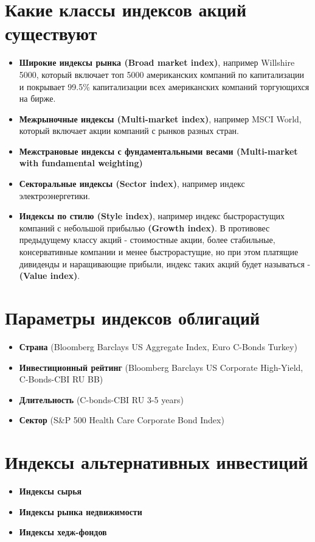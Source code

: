 \documentclass{article}
\begin{document}
\section{Какие классы индексов акций существуют}

\begin{itemize}
  \item \textbf{Широкие индексы рынка (Broad market index)}, например Willshire 5000, который включает топ 5000 американских компаний по капитализации и покрывает 99.5\% капитализации всех американских компаний торгующихся на бирже.
  \item \textbf{Межрыночные индексы (Multi-market index)}, например MSCI World, который включает акции компаний с рынков разных стран.
  \item \textbf{Межстрановые индексы с фундаментальными весами (Multi-market with fundamental weighting)}
  \item \textbf{Секторальные индексы (Sector index)}, например индекс электроэнергетики.
  \item  \textbf{Индексы по стилю (Style index)}, например индекс быстрорастущих компаний с небольшой прибылью \textbf{(Growth index)}. В противовес предыдущему классу акций - стоимостные акции, более стабильные, консервативные компании и менее быстрорастущие, но при этом платящие дивиденды и наращивающие прибыли, индекс таких акций будет называться - \textbf{(Value index)}. 
\end{itemize}
\newpage
\section{Параметры индексов облигаций}
\begin{itemize}
  \item \textbf{Страна} (Bloomberg Barclays US Aggregate Index, Euro C-Bonds Turkey)
  \item \textbf{Инвестиционный рейтинг} (Bloomberg Barclays US Corporate High-Yield, C-Bonds-CBI RU BB)
  \item \textbf{Длительность} (C-bonds-CBI RU 3-5 years)
  \item \textbf{Сектор} (S&P 500 Health Care Corporate Bond Index)
\end{itemize}
\section{Индексы альтернативных инвестиций}
\begin{itemize}
  \item \textbf{Индексы сырья}
  \item \textbf{Индексы рынка недвижимости}
  \item \textbf{Индексы хедж-фондов}
\end{itemize}
\end{document}

